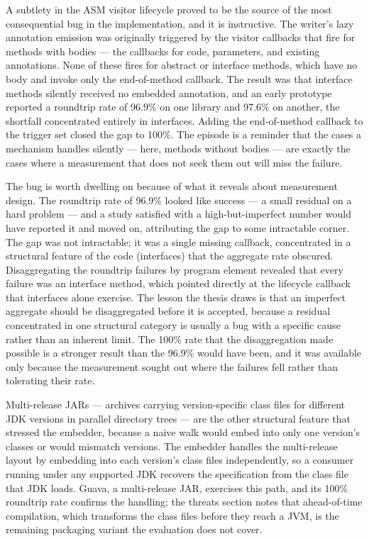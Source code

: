 A subtlety in the ASM visitor lifecycle proved to be the source of the most
consequential bug in the implementation, and it is instructive. The writer's
lazy annotation emission was originally triggered by the visitor callbacks that
fire for methods with bodies --- the callbacks for code, parameters, and
existing annotations. None of these fires for abstract or interface methods,
which have no body and invoke only the end-of-method callback. The result was
that interface methods silently received no embedded annotation, and an early
prototype reported a roundtrip rate of 96.9\% on one library and 97.6\% on
another, the shortfall concentrated entirely in interfaces. Adding the
end-of-method callback to the trigger set closed the gap to 100\%. The episode
is a reminder that the cases a mechanism handles silently --- here, methods
without bodies --- are exactly the cases where a measurement that does not seek
them out will miss the failure.

The bug is worth dwelling on because of what it reveals about measurement design.
The roundtrip rate of 96.9\% looked like success --- a small residual on a hard
problem --- and a study satisfied with a high-but-imperfect number would have
reported it and moved on, attributing the gap to some intractable corner. The gap
was not intractable; it was a single missing callback, concentrated in a
structural feature of the code (interfaces) that the aggregate rate obscured.
Disaggregating the roundtrip failures by program element revealed that every
failure was an interface method, which pointed directly at the lifecycle callback
that interfaces alone exercise. The lesson the thesis draws is that an imperfect
aggregate should be disaggregated before it is accepted, because a residual
concentrated in one structural category is usually a bug with a specific cause
rather than an inherent limit. The 100\% rate that the disaggregation made possible
is a stronger result than the 96.9\% would have been, and it was available only
because the measurement sought out where the failures fell rather than tolerating
their rate.

Multi-release JARs --- archives carrying version-specific class files for different
JDK versions in parallel directory trees --- are the other structural feature that
stressed the embedder, because a naive walk would embed into only one version's
classes or would mismatch versions. The embedder handles the multi-release layout
by embedding into each version's class files independently, so a consumer running
under any supported JDK recovers the specification from the class file that JDK
loads. Guava, a multi-release JAR, exercises this path, and its 100\% roundtrip
rate confirms the handling; the threats section notes that ahead-of-time
compilation, which transforms the class files before they reach a JVM, is the
remaining packaging variant the evaluation does not cover.

